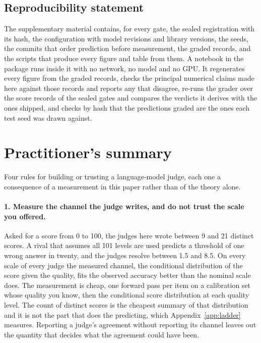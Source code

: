 \documentclass{article}
\theoremstyle{definition}
\theoremstyle{remark}
\begin{document}
\subsection*{Reproducibility statement}
The supplementary material contains, for every gate, the sealed registration with its hash, the configuration with model revisions and library versions, the seeds, the commits that order prediction before measurement, the graded records, and the scripts that produce every figure and table from them.
A notebook in the package runs inside it with no network, no model and no GPU. It regenerates every figure from the graded records, checks the principal numerical claims made here against those records and reports any that disagree, re-runs the grader over the score records of the sealed gates and compares the verdicts it derives with the ones shipped, and checks by hash that the predictions graded are the ones each test seed was drawn against.




\appendix

\section{Practitioner's summary}
\label{app:practice}

Four rules for building or trusting a language-model judge, each one a consequence of a measurement
in this paper rather than of the theory alone.

\paragraph{1. Measure the channel the judge writes, and do not trust the scale you offered.}
Asked for a score from 0 to 100, the judges here wrote between 9 and 21 distinct scores.
A rival that assumes all 101 levels are used predicts a threshold of one wrong answer in twenty, and the judges resolve between 1.5 and 8.5.
On every scale of every judge the measured channel, the conditional distribution of the score given the quality, fits the observed accuracy better than the nominal scale does.
The measurement is cheap, one forward pass per item on a calibration set whose quality you know, then the conditional score distribution at each quality level.
The count of distinct scores is the cheapest summary of that distribution and it is not the part that does the predicting, which Appendix~\ref{app:ladder} measures.
Reporting a judge's agreement without reporting its channel leaves out the quantity that decides
what the agreement could have been.
\end{document}
